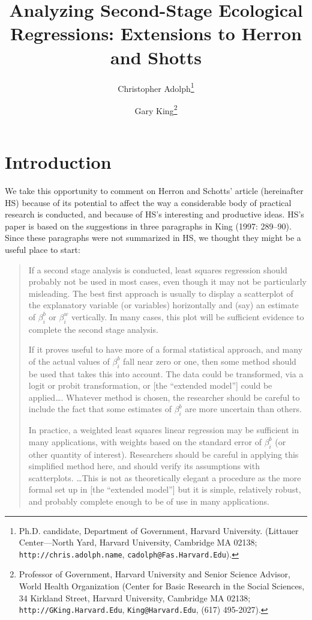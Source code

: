 \documentclass[11pt,titlepage]{article}
\title{Analyzing Second-Stage Ecological Regressions: Extensions to
  Herron and Shotts}
\author{Christopher Adolph\thanks{Ph.D. candidate, Department of
    Government, Harvard University. (Littauer Center---North Yard,
    Harvard University, Cambridge MA 02138;
    \texttt{http://chris.adolph.name},
    \texttt{cadolph@Fas.Harvard.Edu}).}
\and %
Gary King\thanks{Professor of Government, Harvard University and
  Senior Science Advisor, World Health Organization (Center for Basic
  Research in the Social Sciences, 34 Kirkland Street, Harvard
  University, Cambridge MA 02138; \texttt{http://GKing.Harvard.Edu},
  \texttt{King@Harvard.Edu}, (617) 495-2027).}  }
\begin{document}
\maketitle

\section{Introduction}

We take this opportunity to comment on Herron and Schotts' article
(hereinafter HS) because of its potential to affect the way a
considerable body of practical research is conducted, and because of
HS's interesting and productive ideas.  HS's paper is based on the
suggestions in three paragraphs in King (1997: 289--90).  Since these
paragraphs were not summarized in HS, we thought they might be a
useful place to start:
\begin{quotation}
  If a second stage analysis is conducted, least squares regression
  should probably not be used in most cases, even though it may not be
  particularly misleading.  The best first approach is usually to
  display a scatterplot of the explanatory variable (or variables)
  horizontally and (say) an estimate of $\beta_i^b$ or $\beta_i^w$
  vertically.  In many cases, this plot will be sufficient evidence to
  complete the second stage analysis.
  
  If it proves useful to have more of a formal statistical approach,
  and many of the actual values of $\beta_i^b$ fall near zero or one,
  then some method should be used that takes this into account.  The
  data could be transformed, via a logit or probit transformation, or
  [the ``extended model''] could be applied\ldots.  Whatever method is
  chosen, the researcher should be careful to include the fact that
  some estimates of $\beta_i^b$ are more uncertain than others.
    
  In practice, a weighted least squares linear regression may be
  sufficient in many applications, with weights based on the standard
  error of $\beta_i^b$ (or other quantity of interest).  Researchers
  should be careful in applying this simplified method here, and
  should verify its assumptions with scatterplots. \ldots This is not
  as theoretically elegant a procedure as the more formal set up in
  [the ``extended model''] but it is simple, relatively robust, and
  probably complete enough to be of use in many applications.
\end{quotation}  
\end{document}
